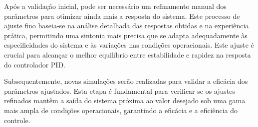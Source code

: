 Após a validação inicial, pode ser necessário um refinamento manual dos parâmetros para otimizar ainda mais a resposta do sistema. Este processo de ajuste fino baseia-se na análise detalhada das respostas obtidas e na experiência prática, permitindo uma sintonia mais precisa que se adapta adequadamente às especificidades do sistema e às variações nas condições operacionais. Este ajuste é crucial para alcançar o melhor equilíbrio entre estabilidade e rapidez na resposta do controlador PID.

Subsequentemente, novas simulações serão realizadas para validar a eficácia dos parâmetros ajustados. Esta etapa é fundamental para verificar se os ajustes refinados mantêm a saída do sistema próxima ao valor desejado sob uma gama mais ampla de condições operacionais, garantindo a eficácia e a eficiência do controle.